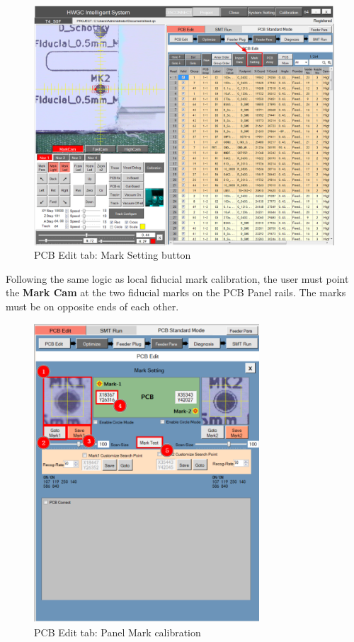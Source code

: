\documentclass[a4paper,10pt]{report}
\begin{document}
\begin{figure}[!htb]
 \centering
 \includegraphics[width=1\textwidth]{images/scrot16.png}
 \caption{PCB Edit tab: Mark Setting button}
\end{figure}
\newpage
Following the same logic as local fiducial mark calibration, the user must point the \textbf{Mark Cam} at the two fiducial marks on the PCB Panel rails. The marks must be on opposite ends of each other.
\begin{figure}[!htb]
 \centering
 \includegraphics[width=0.75\textwidth]{images/scrot17.png}
 \caption{PCB Edit tab: Panel Mark calibration}
\end{figure}
\end{document}
